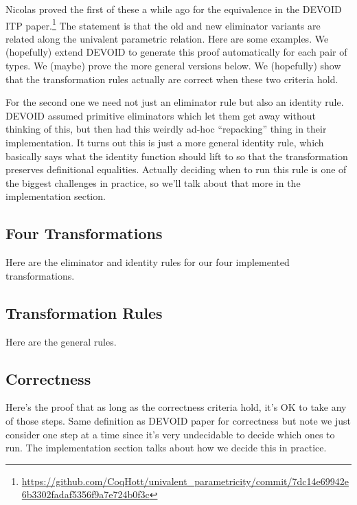 Nicolas proved the first of these a while ago
for the equivalence in the DEVOID ITP paper.\footnote{\url{https://github.com/CoqHott/univalent_parametricity/commit/7dc14e69942e6b3302fadaf5356f9a7e724b0f3c}}
The statement is that the old and new eliminator variants are related along the univalent parametric relation.
Here are some examples.
We (hopefully) extend DEVOID to generate this proof automatically for each pair of types.
We (maybe) prove the more general versions below. 
We (hopefully) show that the transformation rules actually are correct when these two criteria hold.

For the second one we need not just an eliminator rule but also an identity rule.
DEVOID assumed primitive eliminators which let them get away without thinking of this,
but then had this weirdly ad-hoc ``repacking'' thing in their implementation.
It turns out this is just a more general identity rule, which basically says what
the identity function should lift to so that the transformation preserves definitional equalities.
Actually deciding when to run this rule is one of the biggest challenges in practice,
so we'll talk about that more in the implementation section.

\subsection{Four Transformations}

Here are the eliminator and identity rules for our four implemented transformations.

\subsection{Transformation Rules}

Here are the general rules.

\subsection{Correctness}

Here's the proof that as long as the correctness criteria hold, it's OK to take any of those steps.
Same definition as DEVOID paper for correctness but note we just consider one step at a time since
it's very undecidable to decide which ones to run. The implementation section talks about how we
decide this in practice.



